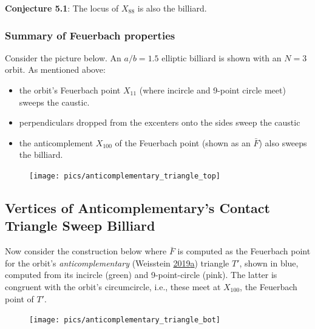 \documentclass[]{article}
\providecommand{\tightlist}{%
  \setlength{\itemsep}{0pt}\setlength{\parskip}{0pt}}
\begin{document}
\textbf{Conjecture 5.1}: The locus of \(X_{88}\) is also the billiard.

\hypertarget{summary-of-feuerbach-properties}{%
\subsubsection{Summary of Feuerbach properties}\label{summary-of-feuerbach-properties}}

Consider the picture below. An \(a/b=1.5\) elliptic billiard is shown with an \(N=3\) orbit. As mentioned above:

\begin{itemize}
\tightlist
\item
  the orbit's Feuerbach point \(X_11\) (where incircle and 9-point circle meet) sweeps the caustic.
\item
  perpendiculars dropped from the excenters onto the sides sweep the caustic
\item
  the anticomplement \(X_{100}\) of the Feuerbach point (shown as an \(\bar{F}\)) also sweeps the billiard.
\end{itemize}

\begin{figure}[H]

{\centering \texttt{[image: pics/anticomplementary\_triangle\_top]} 

}

\end{figure}

\hypertarget{vertices-of-anticomplementarys-contact-triangle-sweep-billiard}{%
\subsection{Vertices of Anticomplementary's Contact Triangle Sweep Billiard}\label{vertices-of-anticomplementarys-contact-triangle-sweep-billiard}}

Now consider the construction below where \(\bar{F}\) is computed as the Feuerbach point for the orbit's \emph{anticomplementary} (Weisstein \protect\hyperlink{ref-mw}{2019}\protect\hyperlink{ref-mw}{a}) triangle \(T'\), shown in blue, computed from its incircle (green) and 9-point-circle (pink). The latter is congruent with the orbit's circumcircle, i.e., these meet at \(X_{100}\), the Feuerbach point of \(T'\).

\begin{figure}[H]

{\centering \texttt{[image: pics/anticomplementary\_triangle\_bot]} 

}

\end{figure}
\end{document}
